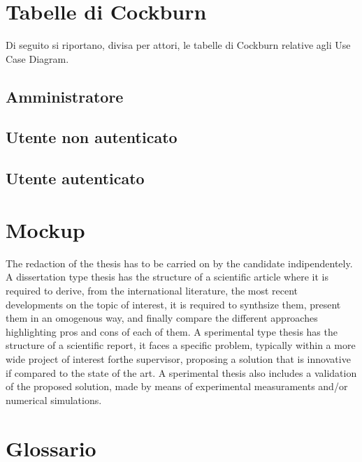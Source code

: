 \section{Tabelle di Cockburn}
Di seguito si riportano, divisa per attori, le tabelle di Cockburn relative agli Use Case Diagram.
\subsection{Amministratore}

\pagebreak

\pagebreak
\subsection{Utente non autenticato}

\pagebreak

\pagebreak
\subsection{Utente autenticato}
\section{Mockup}

The redaction of the thesis has to be carried on by the candidate indipendentely. A dissertation type thesis has the structure of a scientific article where it is required to derive, from the international literature, the most recent developments on the topic of interest, it is required to synthsize them, present them in an omogenous way, and finally compare the different approaches highlighting pros and cons of each of them. A sperimental type thesis has the structure of a scientific report, it faces a specific problem, typically within a more wide project of interest forthe supervisor, proposing a solution that is innovative if compared to the state of the art. A sperimental thesis also includes a validation of the proposed solution, made by means of experimental measuraments and/or numerical simulations.

\section{Glossario}

